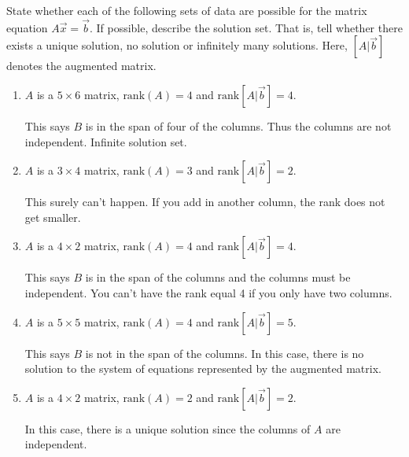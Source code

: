 \documentclass{ximera}
\begin{document}
\begin{problem}\label{prb:2.56} State whether each of the following sets of data are possible for the
matrix equation $A\vec{x}=\vec{b}$. If possible, describe the solution set.
That is, tell whether there exists a unique solution, no solution or
infinitely many solutions. Here, $\left[ A |\vec{b} \right]$ denotes the augmented matrix.

\begin{enumerate}
\item $A$ is a $5\times 6$ matrix, $\mbox{rank}\left( A\right) =4$ and
$\mbox{rank}\left[ A |\vec{b} \right] =4.$
\begin{hint}
This says $B$ is in the span of four of the columns. Thus the columns are not independent. Infinite solution set.
\end{hint}

\item $A$ is a $3\times 4$ matrix, $\mbox{rank}\left( A\right) =3$ and
$\mbox{rank}\left[ A |\vec{b} \right] =2.$
\begin{hint}
This surely can't happen. If you add in another column, the rank does not get smaller.
\end{hint}

\item $A$ is a $4\times 2$ matrix, $\mbox{rank}\left( A\right) =4$ and
$\mbox{rank}\left[ A |\vec{b} \right] =4.$
\begin{hint}
This says $B$ is in the span of the columns and the columns must be
independent. You can't have the rank equal 4 if you only have two columns.
\end{hint}

\item $A$ is a $5\times 5$ matrix, $\mbox{rank}\left( A\right) =4$ and
$\mbox{rank}\left[ A |\vec{b} \right] =5.$
\begin{hint}
This says $B$ is not in the span of the columns. In this case, there is no solution to the system of equations represented by the augmented matrix.
\end{hint}

\item $A$ is a $4\times 2$ matrix, $\mbox{rank}\left( A\right) =2$ and
$\mbox{rank}\left[ A |\vec{b} \right] =2$.

\begin{hint}
In this case, there is a
unique solution since the columns of $A$ are independent.
\end{hint}
\end{enumerate}
\end{problem}
\end{document}
